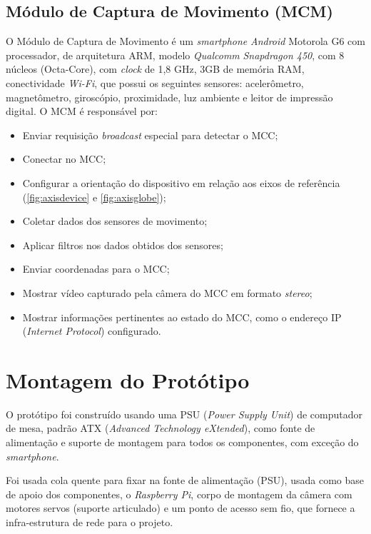 \subsection{Módulo de Captura de Movimento (MCM)}
\label{subsec:modcapmov}

O Módulo de Captura de Movimento é um \textit{smartphone} \textit{Android} Motorola G6 com processador, de arquitetura ARM, modelo \textit{Qualcomm} \textit{Snapdragon 450}, com 8 núcleos (Octa-Core), com \textit{clock} de 1,8 GHz, 3GB de memória RAM, conectividade \textit{Wi-Fi}, que possui os seguintes sensores: acelerômetro, magnetômetro, giroscópio, proximidade, luz ambiente e leitor de impressão digital. O MCM é responsável por:

\begin{itemize}
	\item Enviar requisição \textit{broadcast} especial para detectar o MCC;
	\item Conectar no MCC;
	\item Configurar a orientação do dispositivo em relação aos eixos de referência (\autoref{fig:axisdevice} e \autoref{fig:axisglobe});
	\item Coletar dados dos sensores de movimento;
	\item Aplicar filtros nos dados obtidos dos sensores;
	\item Enviar coordenadas para o MCC;
	\item Mostrar vídeo capturado pela câmera do MCC em formato \textit{stereo};
	\item Mostrar informações pertinentes ao estado do MCC, como o endereço IP (\textit{Internet Protocol}) configurado.
\end{itemize}

\section{Montagem do Protótipo}
\label{sec:assemprototipo}

O protótipo foi construído usando uma PSU (\textit{Power Supply Unit}) de computador de mesa, padrão ATX (\textit{Advanced Technology eXtended}), como fonte de alimentação e suporte de montagem para todos os componentes, com exceção do \textit{smartphone}.\par

Foi usada cola quente para fixar na fonte de alimentação (PSU), usada como base de apoio dos componentes, o \textit{Raspberry Pi}, corpo de montagem da câmera com motores servos (suporte articulado) e um ponto de acesso sem fio, que fornece a infra-estrutura de rede para o projeto. \par

